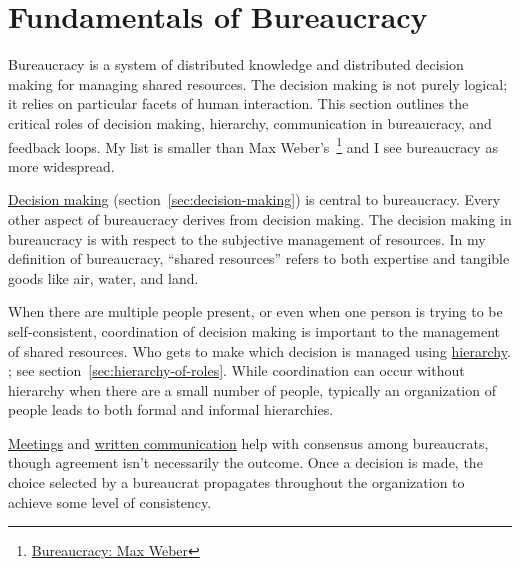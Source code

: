 \section{Fundamentals of Bureaucracy\label{sec:fundamentals-of-b}}
  
Bureaucracy is a system of distributed knowledge and distributed decision making for managing shared resources. The decision making is not purely logical; it relies on particular facets of human interaction. This section outlines the critical roles of decision making, hierarchy, communication in bureaucracy, and feedback loops. 
My list is smaller than Max Weber's~\cite{2015_Weber}\footnote{\href{https://en.wikipedia.org/wiki/Bureaucracy\#Max_Weber}{Bureaucracy: Max Weber}
} and I see bureaucracy as more widespread.

\hyperref[sec:decision-making]{Decision making}
\ifsectionref
(section~\ref{sec:decision-making}) 
\fi
is central to bureaucracy. Every other aspect of bureaucracy derives from decision making. The decision making in bureaucracy is with respect to the subjective management of resources. In my definition of bureaucracy, ``\glspl{shared resource}'' 
refers to both expertise and tangible goods like air, water, and land. 

When there are multiple people present, or even when one person is trying to be self-consistent, coordination of decision making is important to the management of shared resources. Who gets to make which decision is managed using
\hyperref[sec:hierarchy-of-roles]{hierarchy}.
\ifsectionref
; see section~\ref{sec:hierarchy-of-roles}.
\fi
While coordination can occur without hierarchy when there are a small number of people, typically an organization of people leads to both formal and informal hierarchies. 

\hyperref[sec:meetings-for-coordination]{Meetings} and 
\hyperref[sec:written-communication]{written communication} help with consensus among bureaucrats, though agreement isn't necessarily the outcome.
Once a decision is made, the choice selected by a bureaucrat propagates throughout the organization to achieve some level of consistency. 

